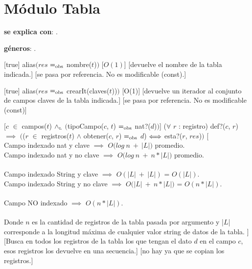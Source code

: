 \section{Módulo Tabla}

\begin{Interfaz}
  
  \textbf{se explica con}: .

  \textbf{géneros}: .


  [true]  
  {alias$\big(res$ $=_{\mathrm{obs}}$ nombre($t$)$\big)$}
  [$O(1)$]
  [devuelve el nombre de la tabla indicada.]
  [se pasa por referencia. No es modificable (const).]
  
  [true]
  {alias$\big(res$ $=_{\mathrm{obs}}$ crearIt(claves($t$))$\big)$}
  [O(1)]
  [devuelve un iterador al conjunto de campos claves de la tabla indicada.]
  [se pasa por referencia. No es modificable (const)]
  
  [$c$ $\in$ campos($t$) $\land_{\mathrm{\scriptscriptstyle{L}}}$ $\big($tipoCampo($c$, $t$) $=_{\mathrm{obs}}$ nat?($d$)$\big)$]
  {($\forall$ $r$ : registro) def?($c$, $r$) $\implies$ $\big($($r$ $\in$ registros($t$) $\land$ obtener($c$, $r$) $=_{\mathrm{obs}}$ $d$) $\Longleftrightarrow$ esta?($r$, $res$)$\big)$}
  [\\
\tab Campo indexado nat y clave $\implies$ $O\big(log\ n\ +\ |L|\big)$ promedio. \\
\tab Campo indexado nat y no clave $\implies$ $O\big(log\ n\ +\ n * |L|\big)$ promedio. \\
\\
\tab Campo indexado String y clave $\implies$ $O(|L|\ +\ |L|)$ = $O(|L|)$. \\ 
\tab Campo indexado String y no clave $\implies$ $O\big(|L|\ +\ n * |L|\big)$ = $O(n * |L|)$. \\
\\
\tab Campo NO indexado $\implies$ $O(n * |L|)$. \\
\\
\tab Donde $n$ es la cantidad de registros de la tabla pasada por argumento y |$L$| corresponde a la longitud máxima de cualquier valor string de datos de la tabla.
]
  [Busca en todos los registros de la tabla los que tengan el dato $d$ en el campo $c$, esos registros los devuelve en una secuencia.]
  [no hay ya que se copian los registros.]


\end{Interfaz}
